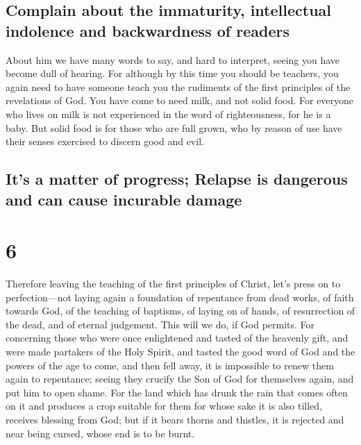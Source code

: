 \hypertarget{complain-about-the-immaturity-intellectual-indolence-and-backwardness-of-readers}{%
\subsection{Complain about the immaturity, intellectual indolence and
backwardness of
readers}\label{complain-about-the-immaturity-intellectual-indolence-and-backwardness-of-readers}}

 About him we have many words to say, and hard to
interpret, seeing you have become dull of hearing.  For
although by this time you should be teachers, you again need to have
someone teach you the rudiments of the first principles of the
revelations of God. You have come to need milk, and not solid food.
 For everyone who lives on milk is not experienced in the
word of righteousness, for he is a baby.  But solid food
is for those who are full grown, who by reason of use have their senses
exercised to discern good and evil.

\hypertarget{its-a-matter-of-progress-relapse-is-dangerous-and-can-cause-incurable-damage}{%
\subsection{It's a matter of progress; Relapse is dangerous and can
cause incurable
damage}\label{its-a-matter-of-progress-relapse-is-dangerous-and-can-cause-incurable-damage}}

\hypertarget{section-5}{%
\section{6}\label{section-5}}

 Therefore leaving the teaching of the first principles of
Christ, let's press on to perfection---not laying again a foundation of
repentance from dead works, of faith towards God,  of the
teaching of baptisms, of laying on of hands, of resurrection of the
dead, and of eternal judgement.  This will we do, if God
permits.  For concerning those who were once enlightened
and tasted of the heavenly gift, and were made partakers of the Holy
Spirit,  and tasted the good word of God and the powers of
the age to come,  and then fell away, it is impossible to
renew them again to repentance; seeing they crucify the Son of God for
themselves again, and put him to open shame.  For the land
which has drunk the rain that comes often on it and produces a crop
suitable for them for whose sake it is also tilled, receives blessing
from God;  but if it bears thorns and thistles, it is
rejected and near being cursed, whose end is to be burnt.

